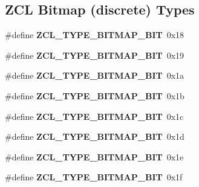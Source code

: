 \subsection*{Z\-C\-L Bitmap (discrete) Types}
\begin{DoxyCompactItemize}
\item 
\hypertarget{group__zcl__types_ga7db6654381619b6523ad087ad614d988}{\#define {\bfseries Z\-C\-L\-\_\-\-T\-Y\-P\-E\-\_\-\-B\-I\-T\-M\-A\-P\-\_\-B\-I\-T}~0x18}\label{group__zcl__types_ga7db6654381619b6523ad087ad614d988}

\item 
\hypertarget{group__zcl__types_ga7f886220f979f20cda20f09f964add37}{\#define {\bfseries Z\-C\-L\-\_\-\-T\-Y\-P\-E\-\_\-\-B\-I\-T\-M\-A\-P\-\_\-B\-I\-T}~0x19}\label{group__zcl__types_ga7f886220f979f20cda20f09f964add37}

\item 
\hypertarget{group__zcl__types_gab977574080a1b9109cbedeb50a8231ac}{\#define {\bfseries Z\-C\-L\-\_\-\-T\-Y\-P\-E\-\_\-\-B\-I\-T\-M\-A\-P\-\_\-B\-I\-T}~0x1a}\label{group__zcl__types_gab977574080a1b9109cbedeb50a8231ac}

\item 
\hypertarget{group__zcl__types_gac8c24fce4d0c613af9f391c9752f4bc8}{\#define {\bfseries Z\-C\-L\-\_\-\-T\-Y\-P\-E\-\_\-\-B\-I\-T\-M\-A\-P\-\_\-B\-I\-T}~0x1b}\label{group__zcl__types_gac8c24fce4d0c613af9f391c9752f4bc8}

\item 
\hypertarget{group__zcl__types_ga353d00de31faa429445b5d810db284d9}{\#define {\bfseries Z\-C\-L\-\_\-\-T\-Y\-P\-E\-\_\-\-B\-I\-T\-M\-A\-P\-\_\-B\-I\-T}~0x1c}\label{group__zcl__types_ga353d00de31faa429445b5d810db284d9}

\item 
\hypertarget{group__zcl__types_ga0e677ca1f39270eb85ddc76661003b93}{\#define {\bfseries Z\-C\-L\-\_\-\-T\-Y\-P\-E\-\_\-\-B\-I\-T\-M\-A\-P\-\_\-B\-I\-T}~0x1d}\label{group__zcl__types_ga0e677ca1f39270eb85ddc76661003b93}

\item 
\hypertarget{group__zcl__types_gace8326adb7b2c3547039391c137b9656}{\#define {\bfseries Z\-C\-L\-\_\-\-T\-Y\-P\-E\-\_\-\-B\-I\-T\-M\-A\-P\-\_\-B\-I\-T}~0x1e}\label{group__zcl__types_gace8326adb7b2c3547039391c137b9656}

\item 
\hypertarget{group__zcl__types_gad4df5246a0d9037921bbae054f5e249c}{\#define {\bfseries Z\-C\-L\-\_\-\-T\-Y\-P\-E\-\_\-\-B\-I\-T\-M\-A\-P\-\_\-B\-I\-T}~0x1f}\label{group__zcl__types_gad4df5246a0d9037921bbae054f5e249c}

\end{DoxyCompactItemize}

